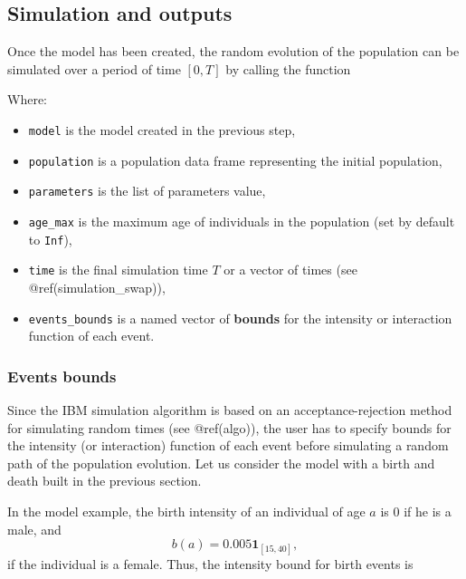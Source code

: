 \hypertarget{simulation}{%
\subsection{Simulation and outputs}\label{simulation}}

Once the model has been created, the random evolution of the population can be simulated over a period of time \([0,T]\) by calling the function

\begin{Shaded}
\begin{Highlighting}[]
\end{Highlighting}
\end{Shaded}

Where:

\begin{itemize}
\tightlist
\item
  \texttt{model} is the model created in the previous step,
\item
  \texttt{population} is a population data frame representing the initial population,
\item
  \texttt{parameters} is the list of parameters value,
\item
  \texttt{age\_max} is the maximum age of individuals in the population (set by default to \texttt{Inf}),
\item
  \texttt{time} is the final simulation time \(T\) or a vector of times (see @ref(simulation\_swap)),
\item
  \texttt{events\_bounds} is a named vector of \textbf{bounds} for the intensity or interaction function of each event.
\end{itemize}

\hypertarget{events-bounds}{%
\subsubsection{Events bounds}\label{events-bounds}}

Since the IBM simulation algorithm is based on an acceptance-rejection method for simulating random times (see @ref(algo)), the user has to specify bounds for the intensity (or interaction) function of each event before simulating a random path of the population evolution. Let us consider the model with a birth and death built in the previous section.

In the model example, the birth intensity of an individual of age \(a\) is \(0\) if he is a male, and
\[ b(a) = 0.005  \mathbf{1}_{[15,40]},\]
if the individual is a female. Thus, the intensity bound for birth events is

